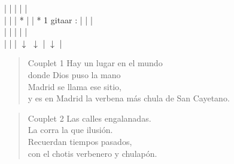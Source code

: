 |  \hspace{3em} | \hspace{2em}  |  \hspace{3em} | \hspace{4em}|\\
|  \hspace{3.05em} | \hspace{2em}  | * \hspace{2.55em} | \hspace{4em}| * 1 gitaar : | |  |\\
|  \hspace{3em} | \hspace{2em}  |  \hspace{3em} | \hspace{4em}|\\
|  \hspace{3.05em} | \hspace{2em}  | $\downarrow$ \hspace{0.25em} $\downarrow$ \hspace{0.5em} | $\downarrow$ \hspace{2.45em}|\\

\begin{verse}{Couplet 1}
Hay un lugar en el mundo\\
donde Dios puso la mano\\
\chord{}Madrid se llama ese sitio,\\
y es en Madrid la verbena m\'{a}s chula de San Cayetano.\\
\end{verse}

\begin{verse}{Couplet 2}
Las calles engalanadas.\\
La corra la que ilusi\'{o}n.\\
Recuerdan tiempos pasados,\\
con el chotis verbenero y chulap\'{o}n.\hspace{1.75em}\\
\end{verse}

